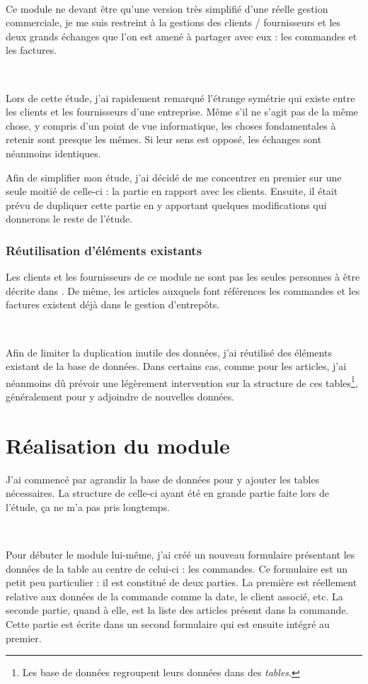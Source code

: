 ~

Ce module ne devant être qu'une version très simplifié d'une \og réelle \fg{} gestion commerciale, je me suis restreint à la gestions des clients / fournisseurs et les deux grands échanges que l'on est amené à partager avec eux : les commandes et les factures.

~

Lors de cette étude, j'ai rapidement remarqué l'étrange symétrie qui existe entre les clients et les fournisseurs d'une entreprise. Même s'il ne s'agit pas de la même chose, y compris d'un point de vue informatique, les choses fondamentales à retenir sont presque les mêmes. Si leur sens est opposé, les échanges sont néanmoins identiques.

Afin de simplifier mon étude, j'ai décidé de me concentrer en premier sur une seule moitié de celle-ci : la partie en rapport avec les clients. Ensuite, il était prévu de dupliquer cette partie en y apportant quelques modifications qui  donnerons le reste de l'étude.

\subsubsection{Réutilisation d'éléments existants}
Les clients et les fournisseurs de ce module ne sont pas les seules \og personnes \fg{} à être décrite dans \integrale. De même, les articles auxquels font références les commandes et les factures existent déjà dans le gestion d'entrepôts.

~

Afin de limiter la duplication inutile des données, j'ai réutilisé des éléments existant de la base de données. Dans certains cas, comme pour les articles, j'ai néanmoins dû prévoir une légèrement intervention sur la structure de ces tables\footnote{Les base de données regroupent leurs données dans des \emph{tables}.}, généralement pour y adjoindre de nouvelles données.

\section{Réalisation du module}
J'ai commencé par agrandir la base de données pour y ajouter les tables nécessaires. La structure de celle-ci ayant été en grande partie faite lors de l'étude, ça ne m'a pas pris longtemps.

~

Pour débuter le module lui-même, j'ai créé un nouveau formulaire présentant les données de la table au centre de celui-ci : les commandes. Ce formulaire est un petit peu particulier : il est constitué de deux parties. La première est réellement relative aux données de la commande comme la date, le client associé, etc. La seconde partie, quand à elle, est la liste des articles présent dans la commande. Cette partie est écrite dans un second formulaire qui est ensuite intégré au premier.

